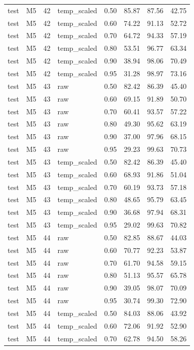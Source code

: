 \begin{tabular}{llrlrrrr}
test & M5 & 42 & temp\_scaled & 0.50 & 85.87 & 87.56 & 42.75 \\
test & M5 & 42 & temp\_scaled & 0.60 & 74.22 & 91.13 & 52.72 \\
test & M5 & 42 & temp\_scaled & 0.70 & 64.72 & 94.33 & 57.19 \\
test & M5 & 42 & temp\_scaled & 0.80 & 53.51 & 96.77 & 63.34 \\
test & M5 & 42 & temp\_scaled & 0.90 & 38.94 & 98.06 & 70.49 \\
test & M5 & 42 & temp\_scaled & 0.95 & 31.28 & 98.97 & 73.16 \\
test & M5 & 43 & raw & 0.50 & 82.42 & 86.39 & 45.40 \\
test & M5 & 43 & raw & 0.60 & 69.15 & 91.89 & 50.70 \\
test & M5 & 43 & raw & 0.70 & 60.41 & 93.57 & 57.22 \\
test & M5 & 43 & raw & 0.80 & 49.30 & 95.62 & 63.19 \\
test & M5 & 43 & raw & 0.90 & 37.00 & 97.96 & 68.15 \\
test & M5 & 43 & raw & 0.95 & 29.23 & 99.63 & 70.73 \\
test & M5 & 43 & temp\_scaled & 0.50 & 82.42 & 86.39 & 45.40 \\
test & M5 & 43 & temp\_scaled & 0.60 & 68.93 & 91.86 & 51.04 \\
test & M5 & 43 & temp\_scaled & 0.70 & 60.19 & 93.73 & 57.18 \\
test & M5 & 43 & temp\_scaled & 0.80 & 48.65 & 95.79 & 63.45 \\
test & M5 & 43 & temp\_scaled & 0.90 & 36.68 & 97.94 & 68.31 \\
test & M5 & 43 & temp\_scaled & 0.95 & 29.02 & 99.63 & 70.82 \\
test & M5 & 44 & raw & 0.50 & 82.85 & 88.67 & 44.03 \\
test & M5 & 44 & raw & 0.60 & 70.77 & 92.23 & 53.87 \\
test & M5 & 44 & raw & 0.70 & 61.70 & 94.58 & 59.15 \\
test & M5 & 44 & raw & 0.80 & 51.13 & 95.57 & 65.78 \\
test & M5 & 44 & raw & 0.90 & 39.05 & 98.07 & 70.09 \\
test & M5 & 44 & raw & 0.95 & 30.74 & 99.30 & 72.90 \\
test & M5 & 44 & temp\_scaled & 0.50 & 84.03 & 88.06 & 43.92 \\
test & M5 & 44 & temp\_scaled & 0.60 & 72.06 & 91.92 & 52.90 \\
test & M5 & 44 & temp\_scaled & 0.70 & 62.78 & 94.50 & 58.26 \\

\end{tabular}
